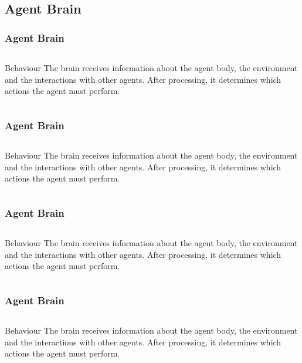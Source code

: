 \documentclass{beamer}
\begin{document}
\subsection{Agent Brain}

\begin{frame}
\frametitle{Agent Brain}
\begin{center}
\begin{columns}
	\column{4cm}
	\begin{block}{Behaviour}
	The brain receives information about the agent body, the environment
	and the interactions with other agents. After processing, it determines
	which actions the agent must perform.
	\end{block}
	\column{3cm}
\end{columns}
\end{center}
\end{frame}

\begin{frame}
\frametitle{Agent Brain}
\begin{center}
\begin{columns}
	\column{4cm}
	\begin{block}{Behaviour}
	The brain receives information about the agent body, the environment
	and the interactions with other agents. After processing, it determines
	which actions the agent must perform.
	\end{block}
	\column{3cm}
\end{columns}
\end{center}
\end{frame}

\begin{frame}
\frametitle{Agent Brain}
\begin{center}
\begin{columns}
	\column{4cm}
	\begin{block}{Behaviour}
	The brain receives information about the agent body, the environment
	and the interactions with other agents. After processing, it determines
	which actions the agent must perform.
	\end{block}
	\column{3cm}
\end{columns}
\end{center}
\end{frame}

\begin{frame}
\frametitle{Agent Brain}
\begin{center}
\begin{columns}
	\column{4cm}
	\begin{block}{Behaviour}
	The brain receives information about the agent body, the environment
	and the interactions with other agents. After processing, it determines
	which actions the agent must perform.
	\end{block}
	\column{3cm}
\end{columns}
\end{center}
\end{frame}
\end{document}
